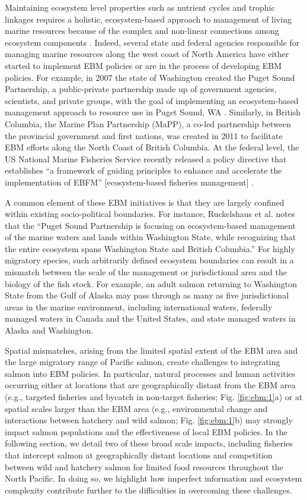 Maintaining ecosystem level properties such as nutrient cycles and trophic
linkages requires a holistic, ecosystem-based approach to management of living
marine resources because of the complex and non-linear connections among
ecosystem components \citep{Engler2015}. Indeed, several state and federal
agencies responsible for managing marine resources along the west coast of North
America have either started to implement EBM policies or are in the process of
developing EBM policies. For example, in 2007 the state of Washington created
the Puget Sound Partnership, a public-private partnership made up of government
agencies, scientists, and private groups, with the goal of implementing an
ecosystem-based management approach to resource use in Puget Sound, WA
\citep{Ruckelshaus2009, Samhouri2011a}. Similarly, in British Columbia, the
Marine Plan Partnership (MaPP), a co-led partnership between the provincial
government and first nations, was created in 2011 to facilitate EBM efforts
along the North Coast of British Columbia. At the federal level, the US National
Marine Fisheries Service recently released a policy directive that establishes
``a framework of guiding principles to enhance and accelerate the implementation
of EBFM'' {[}ecosystem-based fisheries management{]} \citep{NMFS2016}.

A common element of these EBM initiatives is that they are largely confined
within existing socio-political boundaries. For instance, Ruckelshaus et al.
\citet{Ruckelshaus2009} notes that the ``Puget Sound Partnership is focusing on
ecosystem-based management of the marine waters and lands within Washington
State, while recognizing that the entire ecosystem spans Washington State and
British Columbia.'' For highly migratory species, such arbitrarily defined
ecosystem boundaries can result in a mismatch between the scale of the
management or jurisdictional area and the biology of the fish stock. For
example, an adult salmon returning to Washington State from the Gulf of Alaska
may pass through as many as five jurisdictional areas in the marine environment,
including international waters, federally managed waters in Canada and the
United States, and state managed waters in Alaska and Washington.

Spatial mismatches, arising from the limited spatial extent of the EBM area and
the large migratory range of Pacific salmon, create challenges to integrating
salmon into EBM policies. In particular, natural processes and human activities
occurring either at locations that are geographically distant from the EBM area
(e.g., targeted fisheries and bycatch in non-target fisheries; Fig.
\ref{fig:ebm:1}a) or at spatial scales larger than the EBM area (e.g.,
environmental change and interactions between hatchery and wild salmon; Fig.
\ref{fig:ebm:1}b) may strongly impact salmon populations and the effectiveness
of local EBM policies. In the following section, we detail two of these broad
scale impacts, including fisheries that intercept salmon at geographically
distant locations and competition between wild and hatchery salmon for limited
food resources throughout the North Pacific. In doing so, we highlight how
imperfect information and ecosystem complexity contribute further to the
difficulties in overcoming these challenges.

